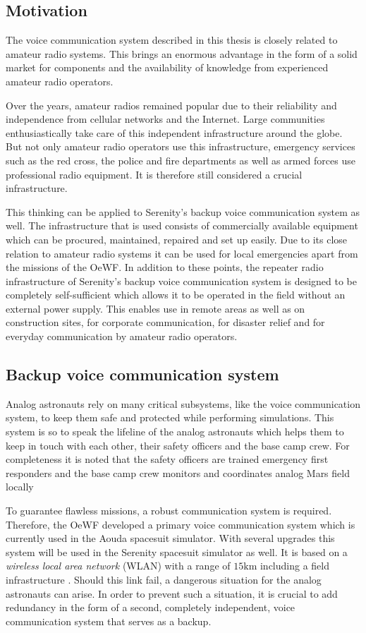 \subsection{Motivation} 
The voice communication system described in this thesis is closely related to amateur radio systems. This brings an enormous advantage in the form of a solid market for components and the availability of knowledge from experienced amateur radio operators.

Over the years, amateur radios remained popular due to their reliability and independence from cellular networks and the Internet. Large communities enthusiastically take care of this independent infrastructure around the globe. But not only amateur radio operators use this infrastructure, emergency services such as the red cross, the police and fire departments as well as armed forces use professional radio equipment. It is therefore still considered a crucial infrastructure. 

This thinking can be applied to Serenity's backup voice communication system as well. The infrastructure that is used consists of commercially available equipment which can be procured, maintained, repaired and set up easily. Due to its close relation to amateur radio systems it can be used for local emergencies apart from the missions of the OeWF. In addition to these points, the repeater radio infrastructure of Serenity's backup voice communication system is designed to be completely self-sufficient which allows it to be operated in the field without an external power supply. This enables use in remote areas as well as on construction sites, for corporate communication, for disaster relief and for everyday communication by amateur radio operators.

\subsection{Backup voice communication system}
Analog astronauts rely on many critical subsystems, like the voice communication system, to keep them safe and protected while performing simulations. This system is so to speak the lifeline of the analog astronauts which helps them to keep in touch with each other, their safety officers and the base camp crew. For completeness it is noted that the safety officers are trained emergency first responders and the base camp crew monitors and coordinates analog Mars field  locally 

To guarantee flawless missions, a robust communication system is required. Therefore, the OeWF developed a primary voice communication system which is currently used in the Aouda spacesuit simulator. With several upgrades this system will be used in the Serenity spacesuit simulator as well. It is based on a \emph{wireless local area network} (WLAN) with a range of $15\mathrm{km}$ including a field infrastructure \cite{Groemer:2020}. Should this link fail, a dangerous situation for the analog astronauts can arise. In order to prevent such a situation, it is crucial to add redundancy in the form of a second, completely independent, voice communication system that serves as a backup. 


